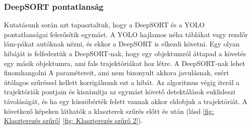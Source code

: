 \documentclass[acmtog, authorversion]{acmart}
\begin{document}
\subsubsection{DeepSORT pontatlanság}
Kutatásunk során azt tapasztaltuk, hogy a DeepSORT és a YOLO pontatlanságai felerősítik egymást. A YOLO hajlamos néha táblákat
vagy rendőr lám-pákat autóknak nézni, és ekkor a DeepSORT is elkezdi követni. Egy olyan hibáját is felfedeztük a DeepSORT-nak, hogy
egy objektumról áttapad a követés egy másik objektumra, ami fals trajektóriákat hoz létre. A DeepSORT-nak lehet finomhangolni A
paramétereit, ami nem bizonyult akkora javulásnak, ezért útólagos szűréssel kellett korrigálnunk ezt a hibát. Az algoritmus végig 
iterál a trajektóriák pontjain és kiszámítja az egymást követő detektálások euklideszi távoláságát, és ha egy küszöbérték felett vannak akkor eldobjuk a trajektóriát.
A következő képeken láthatók a klaszterek szűrés előtt és után (lásd \ref{fig: Klaszterezés szűrő} \ref{fig: Klaszterezés szűrő 2}).
\end{document}
